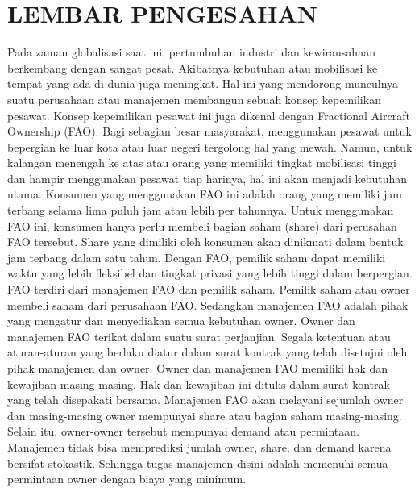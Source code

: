 \chapter*{LEMBAR PENGESAHAN}
Pada zaman globalisasi saat ini, pertumbuhan industri dan kewirausahaan berkembang dengan sangat pesat. Akibatnya kebutuhan atau mobilisasi ke tempat yang ada di dunia juga meningkat. Hal ini yang mendorong munculnya suatu perusahaan atau manajemen membangun sebuah konsep kepemilikan pesawat. Konsep kepemilikan pesawat ini juga dikenal dengan Fractional Aircraft Ownership  (FAO).
Bagi sebagian besar masyarakat, menggunakan pesawat untuk bepergian ke luar kota atau luar negeri tergolong hal yang mewah. Namun, untuk kalangan menengah ke atas atau orang yang memiliki tingkat mobilisasi tinggi dan hampir menggunakan pesawat tiap harinya, hal ini akan menjadi kebutuhan utama. Konsumen yang menggunakan FAO ini adalah orang yang memiliki jam terbang selama lima puluh jam atau lebih per tahunnya.
Untuk menggunakan FAO ini, konsumen hanya perlu membeli bagian saham (share) dari perusahan FAO tersebut. Share yang dimiliki oleh konsumen akan dinikmati dalam bentuk jam terbang dalam satu tahun. Dengan FAO, pemilik saham dapat memiliki waktu yang lebih fleksibel dan tingkat privasi yang lebih tinggi dalam berpergian.
FAO terdiri dari manajemen FAO dan pemilik saham. Pemilik saham atau owner membeli saham dari perusahaan FAO. Sedangkan manajemen FAO adalah pihak yang mengatur dan menyediakan semua kebutuhan owner. Owner dan manajemen FAO terikat dalam suatu surat perjanjian. Segala ketentuan atau aturan-aturan yang berlaku diatur dalam surat kontrak yang telah disetujui oleh pihak manajemen dan owner. Owner dan manajemen FAO memiliki hak dan kewajiban masing-masing. Hak dan kewajiban ini ditulis dalam surat kontrak yang telah disepakati bersama. 
Manajemen FAO akan melayani sejumlah owner dan masing-masing owner mempunyai share atau bagian saham masing-masing. Selain itu, owner-owner tersebut mempunyai demand atau permintaan. Manajemen tidak bisa memprediksi jumlah owner, share, dan demand karena bersifat stokastik. Sehingga tugas manajemen disini adalah memenuhi semua permintaan owner dengan biaya yang minimum.

